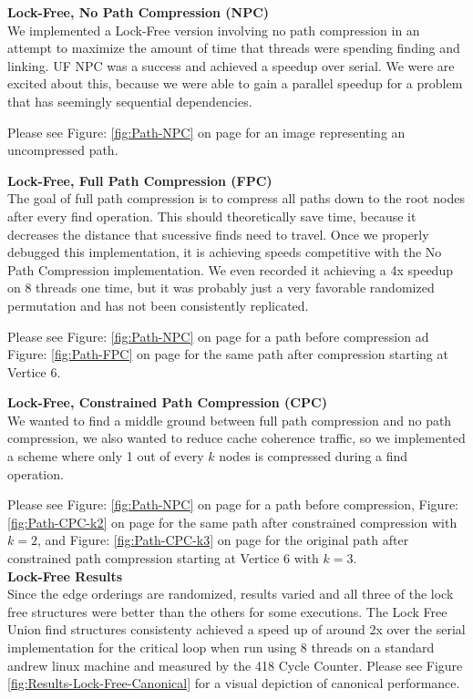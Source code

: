 \documentclass[11pt]{article}
\begin{document}
\textbf{Lock-Free, No Path Compression (NPC)}\\
We implemented a Lock-Free version involving no path compression in an attempt to maximize the amount of time that threads were spending finding and linking. UF NPC was a success and achieved a speedup over serial. We were are excited about this, because we were able to gain a parallel speedup for a problem that has seemingly sequential dependencies.

Please see Figure: \ref{fig:Path-NPC} on page \pageref{fig:Path-NPC} for an image representing an uncompressed path.\\

\newpage

\textbf{Lock-Free, Full Path Compression (FPC)}\\
The goal of full path compression is to compress all paths down to the root nodes after every find operation. This should theoretically save time, because it decreases the distance that sucessive finds need to travel. Once we properly debugged this implementation, it is achieving speeds competitive with the No Path Compression implementation. We even recorded it achieving a 4x speedup on 8 threads one time, but it was probably just a very favorable randomized permutation and has not been consistently replicated.

Please see Figure: \ref{fig:Path-NPC} on page \pageref{fig:Path-NPC} for a path before compression ad Figure: \ref{fig:Path-FPC} on page \pageref{fig:Path-FPC} for the same path after compression starting at Vertice 6.

\textbf{Lock-Free, Constrained Path Compression (CPC)}\\
We wanted to find a middle ground between full path compression and no path compression, we also wanted to reduce cache coherence traffic, so we implemented a scheme where only 1 out of every $k$ nodes is compressed during a find operation.

Please see Figure: \ref{fig:Path-NPC} on page \pageref{fig:Path-NPC} for a path before compression, Figure: \ref{fig:Path-CPC-k2} on page \pageref{fig:Path-CPC-k2} for the same path after constrained compression with $k=2$, and Figure: \ref{fig:Path-CPC-k3} on page \pageref{fig:Path-CPC-k3} for the original path after constrained path compression starting at Vertice 6 with $k=3$.\\


\textbf{Lock-Free Results}\\
Since the edge orderings are randomized, results varied and all three of the lock free structures were better than the others for some executions. The Lock Free Union find structures consistenty achieved a speed up of around 2x over the serial implementation for the critical loop when run using 8 threads on a standard andrew linux machine and measured by the 418 Cycle Counter. Please see Figure \ref{fig:Results-Lock-Free-Canonical} for a visual depiction of canonical performance.\\
\end{document}
